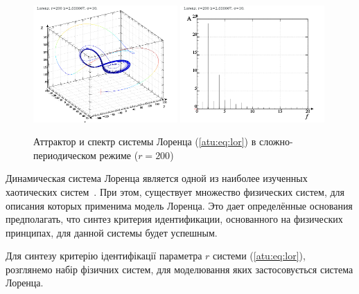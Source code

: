 \begin{figure}[ht!]
\begin{center}
  \includegraphics[width=0.49\textwidth]{p/cha/lor/lor0-p_xyz_r=200.png}
  \hfill
  \includegraphics[width=0.49\textwidth]{p/cha/lor/lor0_fft-p_f_r=200.png}
\end{center}
  \caption{Аттрактор и спектр системы Лоренца (\ref{atu:eq:lor}) в сложно-периодическом режиме ($r=200$)}
\label{atu:f:lor_attractor_phase_200}
\end{figure}



Динамическая система Лоренца является одной из наиболее изученных
хаотических систем~\cite{neimark_stoch_chaos_vibro}. 
При этом, существует множество физических систем, для
описания которых применима модель Лоренца. Это дает определённые основания
предполагать, что синтез критерия идентификации, основанного на физических
принципах, для данной системы будет успешным.


Для синтезу критерію ідентифікації параметра $r$ системи
(\ref{atu:eq:lor}), розглянемо набір фізичних систем, для моделювання яких застосовується
система Лоренца.

